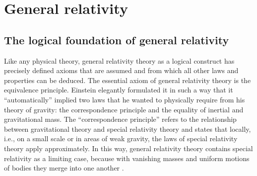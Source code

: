 \chapter{General relativity}


\section{The logical foundation of general relativity}
Like any physical theory, general relativity theory 
as a logical construct has precisely defined axioms that are assumed
and from which all other laws and properties can be deduced.
The essential axiom of general relativity theory is
the equivalence principle. 
Einstein elegantly formulated it in such a way that it “automatically”
implied two laws that he wanted to physically require from his
theory of gravity: the
correspondence principle and the equality of inertial and gravitational
mass.
The “correspondence principle” refers to the relationship
between gravitational theory and special relativity theory and
states that
locally, i.e., on a small scale or 
in areas of weak gravity, the laws of special relativity theory apply approximately.
In this way, general relativity theory contains
special relativity as a limiting case, because with vanishing masses
and uniform motions of bodies they merge into one another
\cite[p. 266]{Born-2001}.

